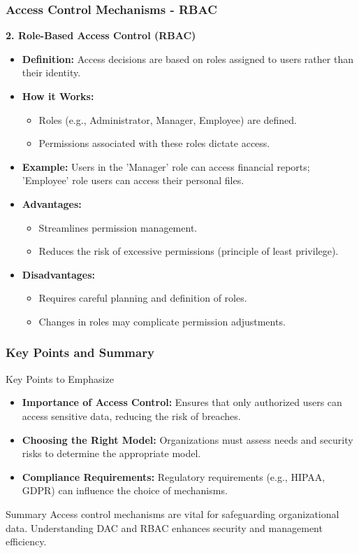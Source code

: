 \documentclass{beamer}
\begin{document}
\begin{frame}[fragile]
    \frametitle{Access Control Mechanisms - RBAC}
    \textbf{2. Role-Based Access Control (RBAC)}
    \begin{itemize}
        \item \textbf{Definition:} Access decisions are based on roles assigned to users rather than their identity.
        \item \textbf{How it Works:}
        \begin{itemize}
            \item Roles (e.g., Administrator, Manager, Employee) are defined.
            \item Permissions associated with these roles dictate access.
        \end{itemize}
        \item \textbf{Example:} Users in the 'Manager' role can access financial reports; 'Employee' role users can access their personal files.
        \item \textbf{Advantages:}
        \begin{itemize}
            \item Streamlines permission management.
            \item Reduces the risk of excessive permissions (principle of least privilege).
        \end{itemize}
        \item \textbf{Disadvantages:}
        \begin{itemize}
            \item Requires careful planning and definition of roles.
            \item Changes in roles may complicate permission adjustments.
        \end{itemize}
    \end{itemize}
\end{frame}

\begin{frame}[fragile]
    \frametitle{Key Points and Summary}
    \begin{block}{Key Points to Emphasize}
        \begin{itemize}
            \item \textbf{Importance of Access Control:} Ensures that only authorized users can access sensitive data, reducing the risk of breaches.
            \item \textbf{Choosing the Right Model:} Organizations must assess needs and security risks to determine the appropriate model.
            \item \textbf{Compliance Requirements:} Regulatory requirements (e.g., HIPAA, GDPR) can influence the choice of mechanisms.
        \end{itemize}
    \end{block}
    \begin{block}{Summary}
        Access control mechanisms are vital for safeguarding organizational data. Understanding DAC and RBAC enhances security and management efficiency.
    \end{block}
\end{frame}
\end{document}
